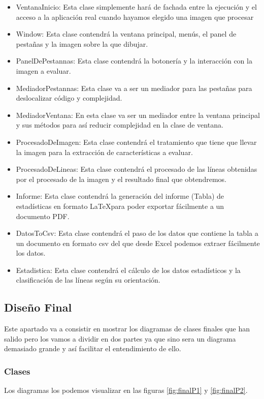 \begin{itemize}
	\item VentanaInicio: 
Esta clase simplemente hará de fachada entre la ejecución y el acceso a la aplicación real cuando hayamos elegido una imagen que procesar
	\item Window:
Esta clase contendrá la ventana principal, menús, el panel de pestañas y la imagen sobre la que dibujar.
	\item PanelDePestannas:
Esta clase contendrá la botonería y la interacción con la imagen a evaluar.
	\item MediadorPestannas:
Esta clase va a ser un mediador para las pestañas para deslocalizar código y complejidad.
	\item MediadorVentana:
En esta clase va ser un mediador entre la ventana principal y sus métodos para así reducir complejidad en la clase de ventana.
	\item ProcesadoDeImagen:
Esta clase contendrá el tratamiento que tiene que llevar la imagen para la extracción de características a evaluar.
	\item ProcesadoDeLineas:
Esta clase contendrá el procesado de las líneas obtenidas por el procesado de la imagen y el resultado final que obtendremos.
	\item Informe: 
Esta clase contendrá la generación del informe (Tabla) de estadísticas en formato \LaTeX para poder exportar fácilmente a un documento PDF.
	\item DatosToCsv:
Esta clase contendrá el paso de los datos que contiene la tabla a un documento en formato csv del que desde Excel podemos extraer fácilmente los datos.
	\item Estadistica: 
Esta clase contendrá el cálculo de los datos estadísticos y la clasificación de las líneas según su orientación.
\end{itemize}


\subsection{Diseño Final}
Este apartado va a consistir en mostrar los diagramas de clases finales que han salido pero los vamos a dividir en dos partes ya que sino sera un diagrama demasiado grande y así facilitar el entendimiento de ello.


\subsubsection{Clases}
Los diagramas los podemos visualizar en las figuras \ref{fig:finalP1} y \ref{fig:finalP2}.

